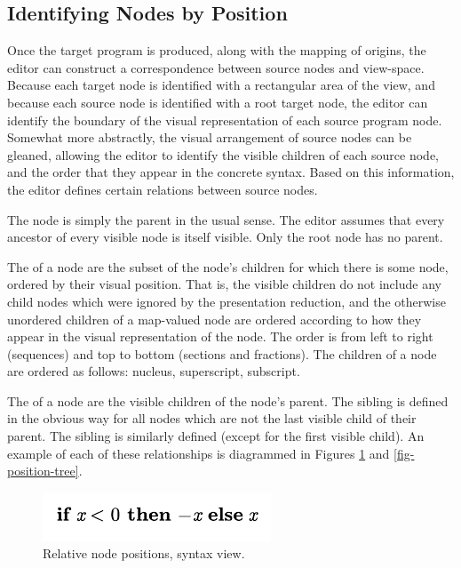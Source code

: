 \subsection{Identifying Nodes by Position}
Once the target program is produced, along with the mapping of origins, the editor can construct a correspondence between source nodes and view-space. Because each target node is identified with a rectangular area of the view, and because each source node is identified with a root target node, the editor can identify the boundary of the visual representation of each source program node. Somewhat more abstractly, the visual arrangement of source nodes can be gleaned, allowing the editor to identify the visible children of each source node, and the order that they appear in the concrete syntax. Based on this information, the editor defines certain relations between source nodes.

The  node is simply the parent in the usual sense. The editor assumes that every ancestor of every visible node is itself visible. Only the root node has no parent.

The  of a node are the subset of the node's children for which there is some  node, ordered by their visual position. That is, the visible children do not include any child nodes which were ignored by the presentation reduction, and the otherwise unordered children of a map-valued node are ordered according to how they appear in the visual representation of the node. The order is from left to right (sequences) and top to bottom (sections and fractions). The children of a  node are ordered as follows: nucleus, superscript, subscript.

The  of a node are the visible children of the node's parent. The  sibling is defined in the obvious way for all nodes which are not the last visible child of their parent. The  sibling is similarly defined (except for the first visible child). An example of each of these relationships is diagrammed in Figures \ref{fig-position} and \ref{fig-position-tree}.

\begin{figure}
  
  \includegraphics{src/image/position.pdf}
  \caption{Relative node positions, syntax view.}
  \label{fig-position}
\end{figure}

